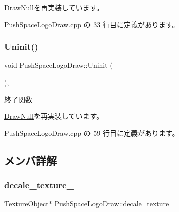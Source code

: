 \mbox{\hyperlink{class_draw_null_a20aef1e54c1a158b741bfd731e18efdf}{Draw\+Null}}を再実装しています。



 Push\+Space\+Logo\+Draw.\+cpp の 33 行目に定義があります。

\mbox{\label{class_push_space_logo_draw_a79021c1df43968d6008de74126d53fba}} 
\subsubsection{\texorpdfstring{Uninit()}{Uninit()}}
{\footnotesize\ttfamily void Push\+Space\+Logo\+Draw\+::\+Uninit (\begin{DoxyParamCaption}{ }\end{DoxyParamCaption})\hspace{0.3cm}{\ttfamily [override]}, {\ttfamily [virtual]}}



終了関数 



\mbox{\hyperlink{class_draw_null_a6e81d63efab7333e8d0e8af99362a4d9}{Draw\+Null}}を再実装しています。



 Push\+Space\+Logo\+Draw.\+cpp の 59 行目に定義があります。



\subsection{メンバ詳解}
\mbox{\label{class_push_space_logo_draw_a9a8c0a4328e5b38a65be20f24fab34f8}} 
\subsubsection{\texorpdfstring{decale\+\_\+texture\+\_\+}{decale\_texture\_}}
{\footnotesize\ttfamily \mbox{\hyperlink{class_texture_object}{Texture\+Object}}$\ast$ Push\+Space\+Logo\+Draw\+::decale\+\_\+texture\+\_\+\hspace{0.3cm}{\ttfamily [private]}}



